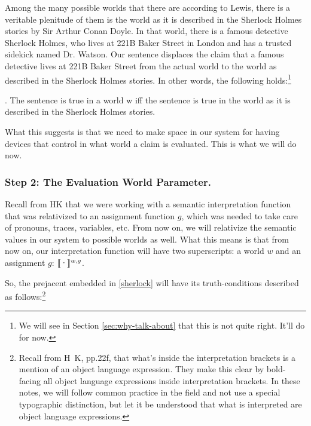 Among the many possible worlds that there are \dash according to Lewis, there is a veritable plenitude of them \dash is the world as it is described in the Sherlock Holmes stories by Sir Arthur Conan Doyle. In that world, there is a famous detective Sherlock Holmes, who lives at 221B Baker Street in London and has a trusted sidekick named Dr. Watson. Our sentence  displaces the claim that a famous detective lives at 221B Baker Street from the actual world to the world as described in the Sherlock Holmes stories. In other words, the following holds:\footnote{We will see in Section \ref{sec:why-talk-about} that this is not quite right. It'll do for now.}

\ex. The sentence  is true in a world w iff the sentence  is true in the world as it is described in the Sherlock Holmes stories.

What this suggests is that we need to make space in our system for having devices that control in what world a claim is evaluated. This is what we will do now. 

\subsubsection{Step 2: The Evaluation World Parameter.} \label{sec:eval-world-param}

Recall from H\amp K that we were working with a semantic interpretation function that was relativized to an assignment function $g$, which was needed to take care of pronouns, traces, variables, etc. From now on, we will relativize the semantic values in our system to possible worlds as well. What this means is that from now on, our interpretation function will have two superscripts: a world $w$ and an assignment $g$: $\sv{\mbox{\textperiodcentered}}^{w,g}$.

So, the prejacent embedded in \ref{sherlock} will have its truth-conditions described as follows:\footnote{Recall from H\amp\ K, pp.22f, that what's inside the interpretation brackets is a mention of an object language expression. They make this clear by bold-facing all object language expressions inside interpretation brackets. In these notes, we will follow common practice in the field and not use a special typographic distinction, but let it be understood that what is interpreted are object language expressions.}


